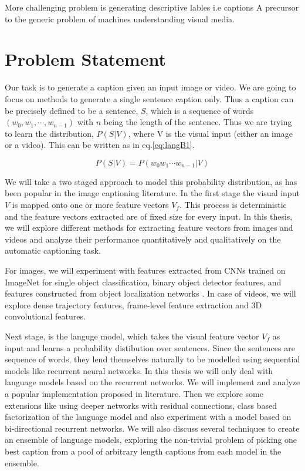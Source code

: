 More challenging problem is generating descriptive lables i.e captions
A precursor to the generic problem of machines understanding visual media. 


\section{Problem Statement}

Our task is to generate a caption given an input image or video. We are going to
focus on methods to generate a single sentence caption only. Thus a caption can
be precisely defined to be a sentence, $S$, which is a sequence of words $(w_0,
w_1,\cdots, w_{n-1})$ with $n$ being the length of the sentence. Thus we are
trying to learn the distribution, $P(S|V)$, where V is the visual input (either
an image or a video). This can be written as in eq.\ref{eq:langB1}. 

\begin{equation}
\label{eq:langB1} P(S|V) = P(w_0 w_1 \cdots w_{n-1}|V)
\end{equation}

We will take a two staged approach to model this probability distribution, as
has been popular in the image captioning literature. In the first stage the
visual input $V$ is mapped onto one or more feature vectors $V_f$. This process
is deterministic and the feature vectors extracted are of fixed size for every
input. In this thesis, we will explore different methods for extracting feature
vectors from images and videos and analyze their performance quantitatively and
qualitatively on the automatic captioning task. 

For images, we will experiment with features extracted from CNNs trained on
ImageNet for single object classification, binary object detector features, and
features constructed from object localization networks .
In case of videos, we will explore dense trajectory features, frame-level
feature extraction and 3D convolutional features. 

Next stage, is the languge model, which takes the visual feature vector $V_f$ as
input and learns a probability distibution over sentences. Since the sentences
are sequence of words, they lend themselves naturally to be modelled using
sequential models like recurrent neural networks. In this thesis we will only
deal with language models based on the recurrent networks. We will implement and
analyze a popular implementation proposed in literature. Then we explore some
extensions like using deeper networks with residual connections, class based
factorization of the language model and also experiment with a model based on
bi-directional recurrent networks. We will also discuss several techniques to
create an ensemble of language models, exploring the non-trivial problem of
picking one best caption from a pool of arbitrary length captions from each
model in the ensemble.

